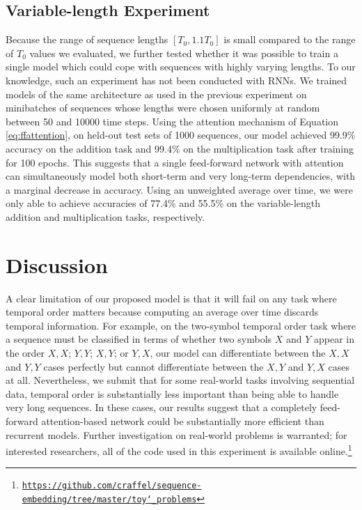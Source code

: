 \documentclass{article} %
\begin{document}
\subsection{Variable-length Experiment}

Because the range of sequence lengths $[T_0, 1.1T_0]$ is small compared to the range of $T_0$ values we evaluated, we further tested whether it was possible to train a single model which could cope with sequences with highly varying lengths.
To our knowledge, such an experiment has not been conducted with RNNs.
We trained models of the same architecture as used in the previous experiment on minibatches of sequences whose lengths were chosen uniformly at random between 50 and 10000 time steps.
Using the attention mechanism of Equation \ref{eq:ffattention}, on held-out test sets of 1000 sequences, our model achieved 99.9\% accuracy on the addition task and 99.4\% on the multiplication task after training for 100 epochs.
This suggests that a single feed-forward network with attention can simultaneously model both short-term and very long-term dependencies, with a marginal decrease in accuracy.
Using an unweighted average over time, we were only able to achieve accuracies of 77.4\% and 55.5\% on the variable-length addition and multiplication tasks, respectively.

\section{Discussion}
\label{sec:limitations}

A clear limitation of our proposed model is that it will fail on any task where temporal order matters because computing an average over time discards temporal information.
For example, on the two-symbol temporal order task \cite{hochreiter1997long} where a sequence must be classified in terms of whether two symbols $X$ and $Y$ appear in the order $X, X$; $Y, Y$; $X, Y$; or $Y, X$, our model can differentiate between the $X, X$ and $Y, Y$ cases perfectly but cannot differentiate between the $X, Y$ and $Y, X$ cases at all.
Nevertheless, we submit that for some real-world tasks involving sequential data, temporal order is substantially less important than being able to handle very long sequences.
In these cases, our results suggest that a completely feed-forward attention-based network could be substantially more efficient than recurrent models.
Further investigation on real-world problems is warranted; for interested researchers, all of the code used in this experiment is available online.\footnote{\href{https://github.com/craffel/sequence-embedding/tree/master/toy_problems}{\texttt{https://github.com/craffel/sequence-embedding/tree/master/toy\char`_problems}}}


\small

\end{document}

